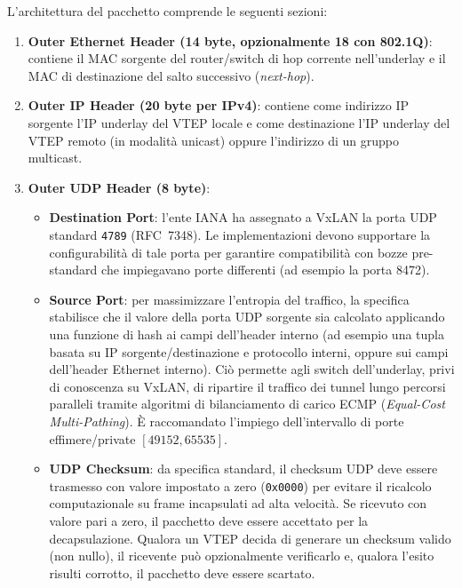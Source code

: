\documentclass[11pt, a4paper]{article}
\begin{document}

L'architettura del pacchetto comprende le seguenti sezioni:
\begin{enumerate}
    \item \textbf{Outer Ethernet Header (14 byte, opzionalmente 18 con 802.1Q)}: contiene il MAC sorgente del router/switch di hop corrente nell'underlay e il MAC di destinazione del salto successivo (\emph{next-hop}).
    \item \textbf{Outer IP Header (20 byte per IPv4)}: contiene come indirizzo IP sorgente l'IP underlay del VTEP locale e come destinazione l'IP underlay del VTEP remoto (in modalità unicast) oppure l'indirizzo di un gruppo multicast.
    \item \textbf{Outer UDP Header (8 byte)}:
    \begin{itemize}[noitemsep]
        \item \textbf{Destination Port}: l'ente IANA ha assegnato a VxLAN la porta UDP standard \texttt{4789} (RFC~7348). Le implementazioni devono supportare la configurabilità di tale porta per garantire compatibilità con bozze pre-standard che impiegavano porte differenti (ad esempio la porta 8472).
        \item \textbf{Source Port}: per massimizzare l'entropia del traffico, la specifica stabilisce che il valore della porta UDP sorgente sia calcolato applicando una funzione di hash ai campi dell'header interno (ad esempio una tupla basata su IP sorgente/destinazione e protocollo interni, oppure sui campi dell'header Ethernet interno). Ciò permette agli switch dell'underlay, privi di conoscenza su VxLAN, di ripartire il traffico dei tunnel lungo percorsi paralleli tramite algoritmi di bilanciamento di carico ECMP (\emph{Equal-Cost Multi-Pathing}). È raccomandato l'impiego dell'intervallo di porte effimere/private $[49152, 65535]$.
        \item \textbf{UDP Checksum}: da specifica standard, il checksum UDP deve essere trasmesso con valore impostato a zero (\texttt{0x0000}) per evitare il ricalcolo computazionale su frame incapsulati ad alta velocità. Se ricevuto con valore pari a zero, il pacchetto deve essere accettato per la decapsulazione. Qualora un VTEP decida di generare un checksum valido (non nullo), il ricevente può opzionalmente verificarlo e, qualora l'esito risulti corrotto, il pacchetto deve essere scartato.

\end{itemize}
\end{enumerate}
\end{document}
